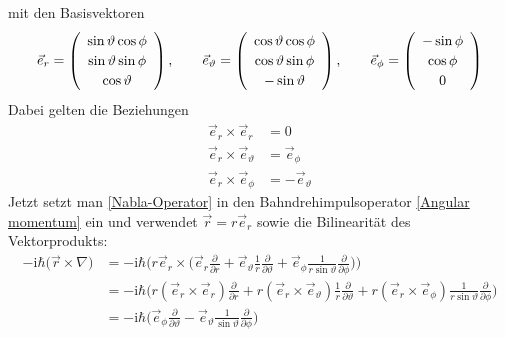 \documentclass[9pt]{report}
\begin{document}
mit den Basisvektoren
\begin{equation}
\vec{e}_{r}=\renewcommand{\arraystretch}{1.2}\left(\begin{array}{c}\sin\vartheta\cos\phi \\ \sin\vartheta\sin\phi \\ \cos\vartheta \\\end{array}\right),
\qquad
\vec{e}_{\vartheta}=\renewcommand{\arraystretch}{1.2}\left(\begin{array}{c}\cos\vartheta\cos\phi \\ \cos\vartheta\sin\phi \\ -\sin\vartheta \\\end{array}\right),
\qquad
\vec{e}_{\phi}=\renewcommand{\arraystretch}{1.2}\left(\begin{array}{c} -\sin\phi \\ \cos\phi \\ 0 \\\end{array}\right)\label{Basisvektoren}
\end{equation}
Dabei gelten die Beziehungen
\begin{align}
\vec{e}_{r}\times\vec{e}_{r} &= 0\\
\vec{e}_{r}\times\vec{e}_{\vartheta} &= \vec{e}_{\phi}\\
\vec{e}_{r}\times\vec{e}_{\phi} &= -\vec{e}_{\vartheta}
\end{align}
Jetzt setzt man \eqref{Nabla-Operator} in den Bahndrehimpulsoperator \eqref{Angular momentum} ein und verwendet $\vec{r}=r\vec{e}_{r}$ sowie die Bilinearität des Vektorprodukts:
\begin{align}
-\mathrm{i}\hbar\big(\vec{r}\times\nabla\big) &= -\mathrm{i}\hbar\bigg(r\vec{e}_{r}\times\Big(\vec{e}_{r}\frac{\partial}{\partial r}+\vec{e}_{\vartheta}\frac{1}{r}\frac{\partial}{\partial\vartheta}+\vec{e}_{\phi}\frac{1}{r\sin\vartheta}\frac{\partial}{\partial\phi}\Big)\bigg)
\\
&= -\mathrm{i}\hbar\bigg(r(\vec{e}_{r}\times\vec{e}_{r})\frac{\partial}{\partial r}+r(\vec{e}_{r}\times\vec{e}_{\vartheta})\frac{1}{r}\frac{\partial}{\partial\vartheta}+r(\vec{e}_{r}\times\vec{e}_{\phi})\frac{1}{r\sin\vartheta}\frac{\partial}{\partial\phi}\bigg)
\\
&= -\mathrm{i}\hbar\bigg(\vec{e}_{\phi}\frac{\partial}{\partial\vartheta}-\vec{e}_{\vartheta}\frac{1}{\sin\vartheta}\frac{\partial}{\partial\phi}\bigg)\label{Bahndrehimpuls in Kugelkoordinaten}
\end{align}
\end{document}
